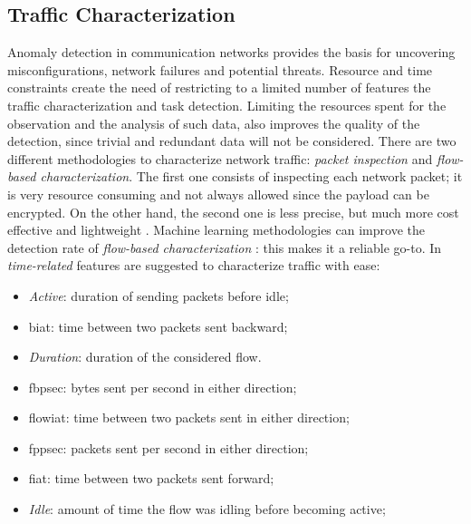 
\subsection{Traffic Characterization}
\label{subsec:traffic-characterization}

Anomaly detection in communication networks provides the basis for uncovering misconfigurations, network failures and potential threats. Resource and time constraints create the need of restricting to a limited number of features the traffic characterization and task detection. Limiting the resources spent for the observation and the analysis of such data, also improves the quality of the detection, since trivial and redundant data will not be considered. There are two different methodologies to characterize network traffic: \textit{packet inspection} and \textit{flow-based characterization}. The first one consists of inspecting each network packet; it is very resource consuming and not always allowed since the payload can be encrypted. On the other hand, the second one is less precise, but much more cost effective and lightweight \cite{Alaidaros2017}. Machine learning methodologies can improve the detection rate of \textit{flow-based characterization} \cite{Iglesias2015}: this makes it a reliable go-to. In \cite{icissp17} \textit{time-related} features are suggested to characterize traffic with ease:
\begin{itemize}
    \item[\faCaretRight] \textit{Active}: duration of sending packets before idle;
    \item[\faCaretRight] \gls{biat}: time between two packets sent backward;
    \item[\faCaretRight] \textit{Duration}: duration of the considered flow.
    \item[\faCaretRight] \gls{fbpsec}: bytes sent per second in either direction;
    \item[\faCaretRight] \gls{flowiat}: time between two packets sent in either direction; 
    \item[\faCaretRight] \gls{fppsec}: packets sent per second in either direction;
    \item[\faCaretRight] \gls{fiat}: time between two packets sent forward; 
    \item[\faCaretRight] \textit{Idle}: amount of time the flow was idling before becoming active;
\end{itemize}
